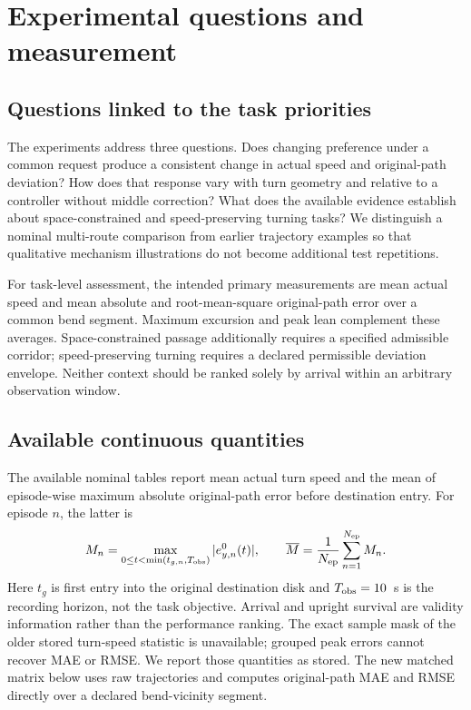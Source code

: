 \documentclass[final,5p,times,twocolumn]{elsarticle}
\begin{document}


\section{Experimental questions and measurement}
\label{sec:experiments}
\subsection{Questions linked to the task priorities}
The experiments address three questions. Does changing preference under a common request produce a consistent change in actual speed and original-path deviation? How does that response vary with turn geometry and relative to a controller without middle correction? What does the available evidence establish about space-constrained and speed-preserving turning tasks? We distinguish a nominal multi-route comparison from earlier trajectory examples so that qualitative mechanism illustrations do not become additional test repetitions.

For task-level assessment, the intended primary measurements are mean actual speed and mean absolute and root-mean-square original-path error over a common bend segment. Maximum excursion and peak lean complement these averages. Space-constrained passage additionally requires a specified admissible corridor; speed-preserving turning requires a declared permissible deviation envelope. Neither context should be ranked solely by arrival within an arbitrary observation window.

\subsection{Available continuous quantities}
The available nominal tables report mean actual turn speed and the mean of episode-wise maximum absolute original-path error before destination entry. For episode $n$, the latter is
\begin{equation}
 M_n=\max_{0\le t<\min(t_{g,n},T_{\rm obs})}|e_{y,n}^0(t)|,
 \qquad \overline M=\frac1{N_{\rm ep}}\sum_{n=1}^{N_{\rm ep}} M_n.
\label{eq:maxerror}
\end{equation}
Here $t_g$ is first entry into the original destination disk and $T_{\rm obs}=10$~s is the recording horizon, not the task objective. Arrival and upright survival are validity information rather than the performance ranking. The exact sample mask of the older stored turn-speed statistic is unavailable; grouped peak errors cannot recover MAE or RMSE. We report those quantities as stored. The new matched matrix below uses raw trajectories and computes original-path MAE and RMSE directly over a declared bend-vicinity segment.
\end{document}
